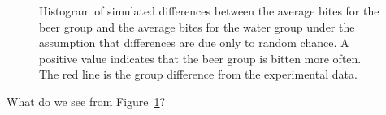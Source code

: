 \documentclass[
  letterpaper,
  DIV=11,
  numbers=noendperiod]{scrartcl}
\begin{document}
\begin{figure}[H]


\caption{\label{fig-bites}Histogram of simulated differences between the
average bites for the beer group and the average bites for the water
group under the assumption that differences are due only to random
chance. A positive value indicates that the beer group is bitten more
often. The red line is the group difference from the experimental data.}

\end{figure}%

What do we see from Figure~\ref{fig-bites}?
\end{document}
